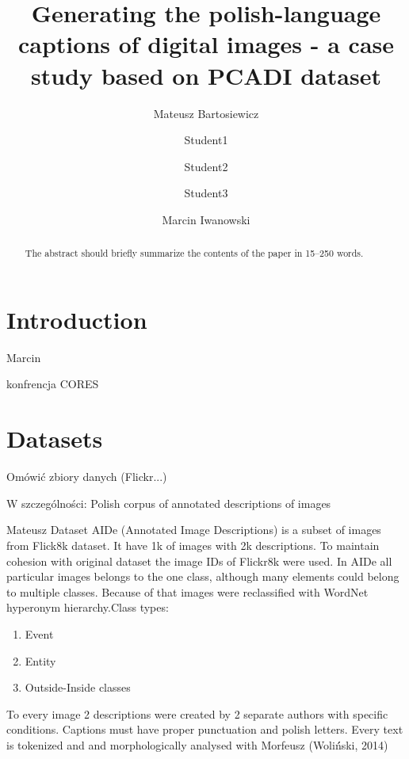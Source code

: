 \documentclass[runningheads]{llncs}
\begin{document}
%
\title{Generating the polish-language captions of digital images - a case study based on PCADI dataset}
%
%
\author{Mateusz Bartosiewicz \and
Student1 \and Student2 \and Student3 \and
Marcin Iwanowski}
%
%
%
%
\maketitle              %
%
\begin{abstract}
The abstract should briefly summarize the contents of the paper in
15--250 words.

\end{abstract}
%
%
\section{Introduction}

Marcin



konfrencja CORES

\section{Datasets}

Omówić zbiory danych (Flickr...)

W szczególności: Polish corpus of annotated descriptions of images

Mateusz
Dataset AIDe (Annotated Image Descriptions) is a subset of images from Flick8k dataset. It have 1k of images with 2k descriptions. To maintain cohesion with original dataset the image IDs of Flickr8k were used. In AIDe all particular images belongs to the one class, although many elements could belong to multiple classes. Because of that images were reclassified with WordNet hyperonym hierarchy.Class types:
\begin{enumerate}
    \item Event
    \item Entity
    \item Outside-Inside classes
\end{enumerate}
To every image 2 descriptions were created by 2 separate authors with specific conditions. Captions must have proper punctuation and polish letters. Every text is tokenized and and morphologically analysed with Morfeusz (Woliń́ski, 2014)
\end{document}
